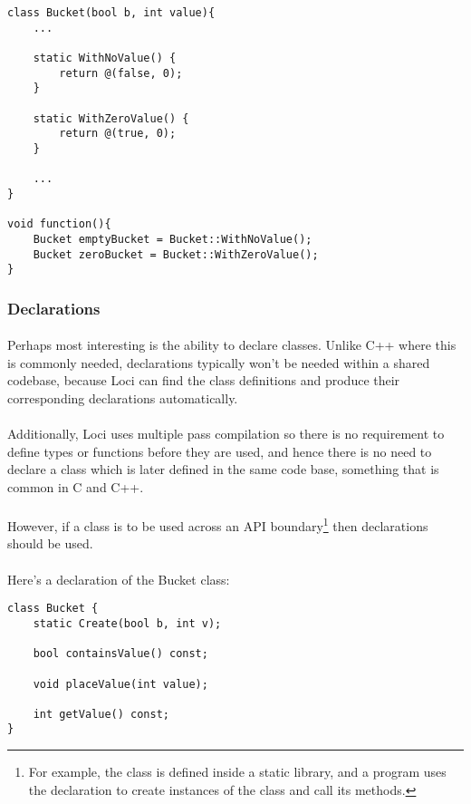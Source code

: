 \documentclass[12pt,twoside,notitlepage]{report}
\begin{document}
\begin{lstlisting}
class Bucket(bool b, int value){
	...
	
	static WithNoValue() {
		return @(false, 0);
	}
	
	static WithZeroValue() {
		return @(true, 0);
	}

	...
}

void function(){
	Bucket emptyBucket = Bucket::WithNoValue();
	Bucket zeroBucket = Bucket::WithZeroValue();
}
\end{lstlisting}


\subsubsection{Declarations}

\paragraph{}
Perhaps most interesting is the ability to declare classes. Unlike C++ where this is commonly needed, declarations typically won't be needed within a shared codebase, because Loci can find the class definitions and produce their corresponding declarations automatically.

\paragraph{}
Additionally, Loci uses multiple pass compilation so there is no requirement to define types or functions before they are used, and hence there is no need to declare a class which is later defined in the same code base, something that is common in C and C++.

\paragraph{}
However, if a class is to be used across an API boundary\footnote{For example, the class is defined inside a static library, and a program uses the declaration to create instances of the class and call its methods.} then declarations should be used.

\paragraph{}
Here's a declaration of the Bucket class:


\begin{lstlisting}
class Bucket {
	static Create(bool b, int v);

	bool containsValue() const;
	
	void placeValue(int value);
	
	int getValue() const;
}
\end{lstlisting}
\end{document}

